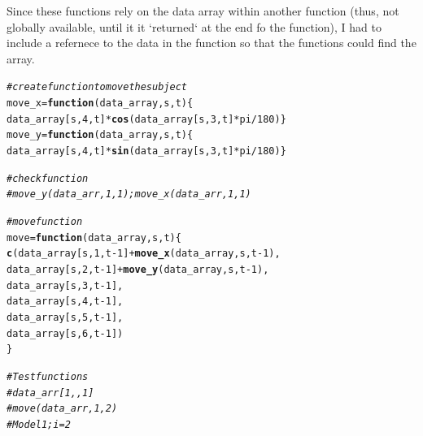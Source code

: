 \documentclass{article}\usepackage[]{graphicx}\usepackage[]{color}
\makeatletter
\newcommand{\hlnum}[1]{\textcolor[rgb]{0.686,0.059,0.569}{#1}}%
\newcommand{\hlcom}[1]{\textcolor[rgb]{0.678,0.584,0.686}{\textit{#1}}}%
\newcommand{\hlopt}[1]{\textcolor[rgb]{0,0,0}{#1}}%
\newcommand{\hlstd}[1]{\textcolor[rgb]{0.345,0.345,0.345}{#1}}%
\newcommand{\hlkwa}[1]{\textcolor[rgb]{0.161,0.373,0.58}{\textbf{#1}}}%
\newcommand{\hlkwb}[1]{\textcolor[rgb]{0.69,0.353,0.396}{#1}}%
\newcommand{\hlkwc}[1]{\textcolor[rgb]{0.333,0.667,0.333}{#1}}%
\newcommand{\hlkwd}[1]{\textcolor[rgb]{0.737,0.353,0.396}{\textbf{#1}}}%
\newenvironment{kframe}{%
 \def\at@end@of@kframe{}%
 \ifinner\ifhmode%
  \def\at@end@of@kframe{\end{minipage}}%
  \begin{minipage}{\columnwidth}%
 \fi\fi%
 \def\FrameCommand##1{\hskip\@totalleftmargin \hskip-\fboxsep
 \colorbox{shadecolor}{##1}\hskip-\fboxsep
     \hskip-\linewidth \hskip-\@totalleftmargin \hskip\columnwidth}%
 \MakeFramed {\advance\hsize-\width
   \@totalleftmargin\z@ \linewidth\hsize
   \@setminipage}}%
 {\par\unskip\endMakeFramed%
 \at@end@of@kframe}
\newenvironment{knitrout}{}{} %
\makeatother
\begin{document}
Since these functions rely on the data array within another function (thus, not globally available, until it it `returned` at the end fo the function), I had to include a refernece to the data in the function so that the functions could find the array.

\begin{knitrout}
\color{fgcolor}\begin{kframe}
\begin{alltt}
\hlcom{#create function to move the subject}
\hlstd{move_x} \hlkwb{=} \hlkwa{function}\hlstd{(}\hlkwc{data_array}\hlstd{,} \hlkwc{s}\hlstd{,} \hlkwc{t}\hlstd{)\{}
\hlstd{data_array[s,} \hlnum{4}\hlstd{, t]} \hlopt{*} \hlkwd{cos}\hlstd{(data_array[s,}\hlnum{3}\hlstd{, t]}\hlopt{*}\hlstd{pi}\hlopt{/}\hlnum{180}\hlstd{)\}}
\hlstd{move_y} \hlkwb{=} \hlkwa{function}\hlstd{(}\hlkwc{data_array}\hlstd{,} \hlkwc{s}\hlstd{,} \hlkwc{t}\hlstd{)\{}
\hlstd{data_array[s,} \hlnum{4}\hlstd{, t]} \hlopt{*} \hlkwd{sin}\hlstd{(data_array[s,}\hlnum{3}\hlstd{, t]}\hlopt{*}\hlstd{pi}\hlopt{/}\hlnum{180}\hlstd{)\}}

\hlcom{# check function }
\hlcom{# move_y(data_arr, 1, 1); move_x(data_arr, 1,1)}

\hlcom{# move function}
\hlstd{move} \hlkwb{=} \hlkwa{function}\hlstd{(}\hlkwc{data_array}\hlstd{,} \hlkwc{s}\hlstd{,} \hlkwc{t}\hlstd{)\{}
  \hlkwd{c}\hlstd{(data_array[s,} \hlnum{1}\hlstd{, t}\hlopt{-}\hlnum{1}\hlstd{]}\hlopt{+} \hlkwd{move_x}\hlstd{(data_array, s, t}\hlopt{-}\hlnum{1}\hlstd{),}
    \hlstd{data_array[s,} \hlnum{2}\hlstd{, t}\hlopt{-}\hlnum{1}\hlstd{]}\hlopt{+} \hlkwd{move_y}\hlstd{(data_array, s, t}\hlopt{-}\hlnum{1}\hlstd{),}
    \hlstd{data_array[s,} \hlnum{3}\hlstd{, t}\hlopt{-}\hlnum{1}\hlstd{],}
    \hlstd{data_array[s,} \hlnum{4}\hlstd{, t}\hlopt{-}\hlnum{1}\hlstd{],}
    \hlstd{data_array[s,} \hlnum{5}\hlstd{, t}\hlopt{-}\hlnum{1}\hlstd{],}
    \hlstd{data_array[s,} \hlnum{6}\hlstd{, t}\hlopt{-}\hlnum{1}\hlstd{])}
\hlstd{\}}

\hlcom{# Test functions}
\hlcom{# data_arr[1,,1]}
\hlcom{# move(data_arr, 1, 2)}
\hlcom{# Model1; i = 2}
\end{alltt}
\end{kframe}
\end{knitrout}
\end{document}
